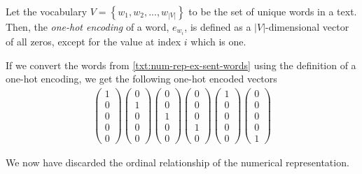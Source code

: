 Let the vocabulary $V = \left \{ w_1, w_2, ..., w_{|V|} \right \}$ to be the set of unique words in a text. Then, the \textit{one-hot encoding} of a word, $e_{w_i}$, is defined as a $|V|$-dimensional vector of all zeros, except for the value at index $i$ which is one.

If we convert the words from \cref{txt:num-rep-ex-sent-words} using the definition of a one-hot encoding, we get the following one-hot encoded vectors
\begin{align}
    \begin{pmatrix}
    1\\
    0\\
    0\\
    0\\
    0
    \end{pmatrix}
    \begin{pmatrix}
    0\\
    1\\
    0\\
    0\\
    0
    \end{pmatrix}
    \begin{pmatrix}
    0\\
    0\\
    1\\
    0\\
    0
    \end{pmatrix}
    \begin{pmatrix}
    0\\
    0\\
    0\\
    1\\
    0
    \end{pmatrix}
    \begin{pmatrix}
    1\\
    0\\
    0\\
    0\\
    0
    \end{pmatrix}
    \begin{pmatrix}
    0\\
    0\\
    0\\
    0\\
    1
    \end{pmatrix}
\end{align}

We now have discarded the ordinal relationship of the numerical representation.

